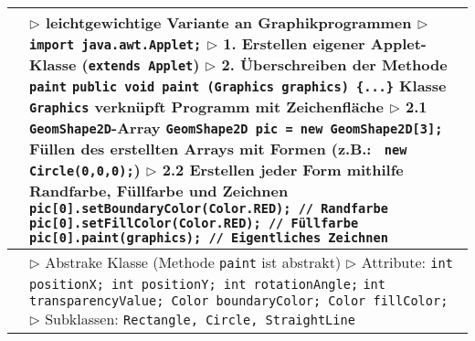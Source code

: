 	\begin{tabular}{ | p{} p{} | }
	\hline
	\makecell[l]{Applet} & \makecell[l]{
	$\rhd$ leichtgewichtige Variante an Graphikprogrammen \\
	$\rhd$ \texttt{import java.awt.Applet;} \\
	$\rhd$ 1. Erstellen eigener Applet-Klasse (\texttt{extends Applet}) \\
	$\rhd$ 2. Überschreiben der Methode \texttt{paint} \\
	\hspace{0.8cm} \texttt{public void paint (Graphics graphics) \{...\}} \\
	\hspace{0.8cm} Klasse \texttt{Graphics} verknüpft Programm mit Zeichenfläche \\
	$\rhd$ 2.1 \texttt{GeomShape2D}-Array \\
	\hspace{0.8cm} \texttt{GeomShape2D pic = new GeomShape2D[3];} \\
	\hspace{0.8cm} Füllen des erstellten Arrays mit Formen (z.B.: \texttt{ new Circle(0,0,0);})\\
	$\rhd$ 2.2 Erstellen jeder Form mithilfe Randfarbe, Füllfarbe und Zeichnen \\
	\hspace{0.8cm} \texttt{pic[0].setBoundaryColor(Color.RED); // Randfarbe} \\
	\hspace{0.8cm} \texttt{pic[0].setFillColor(Color.RED);	  // Füllfarbe} \\
	\hspace{0.8cm} \texttt{pic[0].paint(graphics); // Eigentliches Zeichnen}} \\ \hline
	
	\makecell[l]{GeomShape2D} & \makecell[l]{
	$\rhd$ Abstrake Klasse (Methode \texttt{paint} ist abstrakt) \\
	$\rhd$ Attribute: \\
	\hspace{0.4cm} \texttt{int positionX; int positionY; int rotationAngle;} \\
	\hspace{0.4cm} \texttt{int transparencyValue; Color boundaryColor; Color fillColor;} \\
	$\rhd$ Subklassen: \texttt{Rectangle, Circle, StraightLine} } \\ \hline
	\end{tabular}


